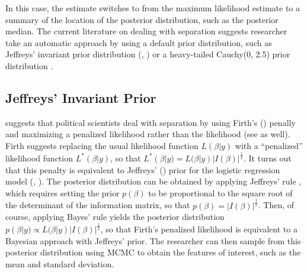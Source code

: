 \documentclass[12pt]{article}
\begin{document}
\noindent In this case, the estimate switches to from the maximum likelihood estimate to a summary of the location of the posterior distribution, such as the posterior median. The current literature on dealing with separation suggests researcher take an automatic approach by using a default prior distribution, such as Jeffreys' invariant prior distribution (\citealt{Jeffreys1946}, \citealt{Zorn2005}) or a heavy-tailed Cauchy(0, 2.5) prior distribution \citep{Gelmanetal2008}.

\subsection*{Jeffreys' Invariant Prior}

\cite{Zorn2005} suggests that political scientists deal with separation by using Firth's (\citeyear{Firth1993}) penally and maximizing a penalized likelihood rather than the likelihood (see \citealt{HeinzeSchemper2002} as well). Firth suggests replacing the usual likelihood function $L(\beta | y)$ with a ``penalized'' likelihood function $L^*(\beta | y)$, so that $L^*(\beta | y) = L(\beta | y)|I(\beta)|^\frac{1}{2}$. It turns out that this penalty is equivalent to Jeffreys' (\citeyear{Jeffreys1946}) prior for the logistic regression model (\citealt{Firth1993}, \citealt{Poirier1994}). The posterior distribution can be obtained by applying Jeffreys' rule \citep{Jeffreys1946}, which requires setting the prior $p(\beta)$ to be proportional to the square root of the determinant of the information matrix, so that $p(\beta) = |I(\beta)|^\frac{1}{2}$. Then, of course, applying Bayes' rule yields the posterior distribution $p(\beta | y) \propto L(\beta | y)|I(\beta)|^\frac{1}{2}$, so that Firth's penalized likelihood is equivalent to a Bayesian approach with Jeffreys' prior. The researcher can then sample from this posterior distribution using MCMC to obtain the features of interest, such as the mean and standard deviation.


\end{document}

